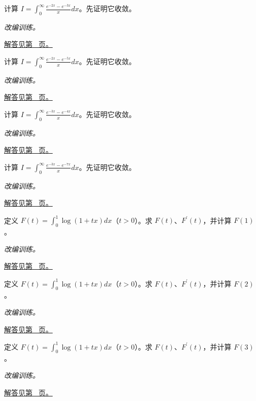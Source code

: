 \documentclass[UTF8,12pt,a4paper,fontset=fandol]{ctexart}
\begin{document}
\begin{example}[两个衰减指数的消差]\label{ex:c20q15}
计算 $I=\displaystyle\int_0^\infty\frac{e^{-2x}-e^{-3x}}x dx$。先证明它收敛。
\par\textit{改编训练。}\par\hyperref[ans:c20q15]{解答见第~\pageref{ans:c20q15} 页。}
\end{example}
\begin{example}[两个衰减指数的消差]\label{ex:c20q16}
计算 $I=\displaystyle\int_0^\infty\frac{e^{-2x}-e^{-5x}}x dx$。先证明它收敛。
\par\textit{改编训练。}\par\hyperref[ans:c20q16]{解答见第~\pageref{ans:c20q16} 页。}
\end{example}
\begin{example}[两个衰减指数的消差]\label{ex:c20q17}
计算 $I=\displaystyle\int_0^\infty\frac{e^{-3x}-e^{-4x}}x dx$。先证明它收敛。
\par\textit{改编训练。}\par\hyperref[ans:c20q17]{解答见第~\pageref{ans:c20q17} 页。}
\end{example}
\begin{example}[两个衰减指数的消差]\label{ex:c20q18}
计算 $I=\displaystyle\int_0^\infty\frac{e^{-3x}-e^{-7x}}x dx$。先证明它收敛。
\par\textit{改编训练。}\par\hyperref[ans:c20q18]{解答见第~\pageref{ans:c20q18} 页。}
\end{example}
\begin{example}[简单含参积分的求导]\label{ex:c20q19}
定义 $F(t)=\int_0^1\log(1+tx)dx$（$t>0$）。求 $F(t)$、$F^{\prime}(t)$，并计算 $F(1)$。
\par\textit{改编训练。}\par\hyperref[ans:c20q19]{解答见第~\pageref{ans:c20q19} 页。}
\end{example}
\begin{example}[简单含参积分的求导]\label{ex:c20q20}
定义 $F(t)=\int_0^1\log(1+tx)dx$（$t>0$）。求 $F(t)$、$F^{\prime}(t)$，并计算 $F(2)$。
\par\textit{改编训练。}\par\hyperref[ans:c20q20]{解答见第~\pageref{ans:c20q20} 页。}
\end{example}
\begin{example}[简单含参积分的求导]\label{ex:c20q21}
定义 $F(t)=\int_0^1\log(1+tx)dx$（$t>0$）。求 $F(t)$、$F^{\prime}(t)$，并计算 $F(3)$。
\par\textit{改编训练。}\par\hyperref[ans:c20q21]{解答见第~\pageref{ans:c20q21} 页。}
\end{example}
\end{document}
